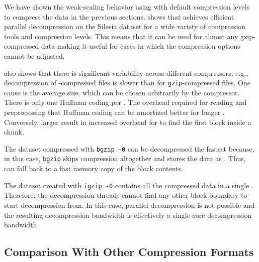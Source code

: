 We have shown the weak-scaling behavior using \pigz with default compression levels to compress the data in the previous sections.
 shows that \pragzip achieves efficient parallel decompression on the Silesia dataset for a wide variety of compression tools and compression levels.
This means that it can be used for almost any gzip-compressed data making it useful for cases in which the compression options cannot be adjusted.

 also shows that there is significant variability across different compressors, e.g., decompression of \pigz-compressed files is slower than for \texttt{gzip}-compressed files.
One cause is the average \dynblock size, which can be chosen arbitrarily by the compressor.
There is only one Huffman coding per \dynblock.
The overhead required for reading and preprocessing that Huffman coding can be amortized better for longer \dynblocks.
Conversely, larger \dynblocks result in increased overhead for \pragzip to find the first  block inside a chunk.

The dataset compressed with \texttt{bgzip -0} can be decompressed the fastest because, in this case, \texttt{bgzip} skips compression altogether and stores the data as \rawblocks.
Thus, \pragzip can fall back to a fast memory copy of the  block contents.

The dataset created with \texttt{igzip -0} contains all the compressed data in a single \dynblock.
Therefore, the \pragzip decompression threads cannot find any other  block boundary to start decompression from.
In this case, parallel decompression is not possible and the resulting decompression bandwidth is effectively a single-core decompression bandwidth.

\subsection{Comparison With Other Compression Formats}
\label{sct:compression-formats}

